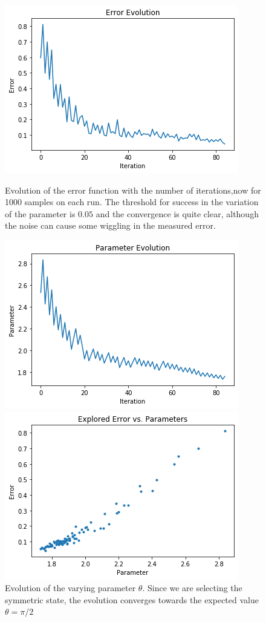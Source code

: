 \documentclass[11pt]{article}
\begin{document}
\begin{figure}[h!]
\centering
\includegraphics[scale=0.5]{error}
\caption{Evolution of the error function with the number of iterations,now for 1000 samples on each run. The threshold for success in the variation of the parameter is $0.05$ and the convergence is quite clear, although the noise can cause some wiggling in the measured error.}
\includegraphics[scale=0.5]{parameter}
\caption{Evolution of the varying parameter $\theta$. Since we are selecting the symmetric state, the evolution converges towards the expected value $\theta = \pi/2$}
\includegraphics[scale=0.5]{explored}

\end{figure}
\end{document}

